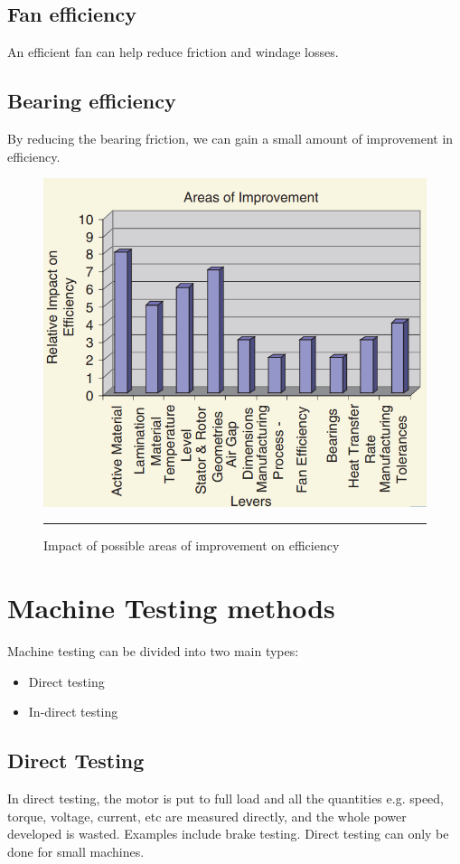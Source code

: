 \subsection{Fan efficiency}
An efficient fan can help reduce friction and windage losses.

\subsection{Bearing efficiency}
By reducing the bearing friction, we can gain a small amount of improvement in efficiency.

\begin{figure}[htbp]
	\centering
		\includegraphics[width = 4.5in]{./Figures/MS/22.png}
		\rule{35em}{0.5pt}
	\caption{Impact of possible areas of improvement on efficiency}
	\label{fig:Typical loss distribution in induction motors}
\end{figure}

\section{Machine Testing methods}
Machine testing can be divided into two main types:
\begin{itemize}
	\item Direct testing
	\item In-direct testing
\end{itemize}

\subsection{Direct Testing}
In direct testing, the motor is put to full load and all the quantities e.g. speed, torque, voltage, current, etc are measured directly, and the whole power developed is wasted. Examples include brake testing. Direct testing can only be done for small machines.

